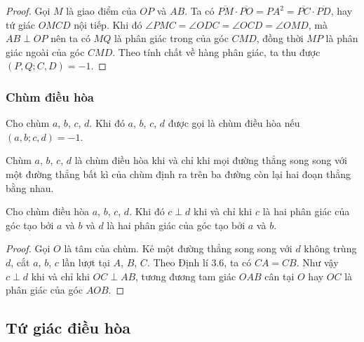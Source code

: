         \begin{proof}
            Gọi \(M\) là giao điểm của \(OP\) và \(AB\). Ta có \(\overline{PM} \cdot \overline{PO} = PA^2 = \overline{PC} \cdot \overline{PD}\), hay tứ giác \(OMCD\) nội tiếp. Khi đó \(\angle PMC = \angle ODC = \angle OCD = \angle OMD\), mà \(AB \perp OP\) nên ta có \(MQ\) là phân giác trong của góc \(CMD\), đồng thời \(MP\) là phân giác ngoài của góc \(CMD\). Theo tính chất về hàng phân giác, ta thu được \((P,Q;C,D) = -1\).
        \end{proof}

        \subsubsection*{Chùm điều hòa}

        \begin{definition}
            Cho chùm \(a\), \(b\), \(c\), \(d\). Khi đó \(a\), \(b\), \(c\), \(d\) được gọi là chùm điều hòa nếu \((a,b;c,d) = -1\).
        \end{definition}

        \begin{theorem}
            Chùm \(a\), \(b\), \(c\), \(d\) là chùm điều hòa khi và chỉ khi mọi đường thẳng song song với một đường thẳng bất kì của chùm định ra trên ba đường còn lại hai đoạn thẳng bằng nhau. 
        \end{theorem}

        \begin{theorem}
            Cho chùm điều hòa \(a\), \(b\), \(c\), \(d\). Khi đó \(c \perp d\) khi và chỉ khi \(c\) là hai phân giác của góc tạo bởi \(a\) và \(b\) và \(d\) là hai phân giác của góc tạo bởi \(a\) và \(b\).
        \end{theorem}

        \begin{proof}
            Gọi \(O\) là tâm của chùm. Kẻ một đường thẳng song song với \(d\) không trùng \(d\), cắt \(a\), \(b\), \(c\) lần lượt tại \(A\), \(B\), \(C\). Theo Định lí 3.6, ta có \(CA = CB\). Như vậy \(c \perp d\) khi và chỉ khi \(OC \perp AB\), tương đương tam giác \(OAB\) cân tại \(O\) hay \(OC\) là phân giác của góc \(AOB\).
        \end{proof}

    \subsection{Tứ giác điều hòa}

